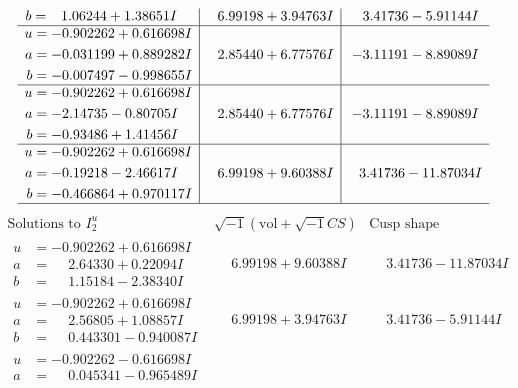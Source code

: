 \documentclass[1p]{elsarticle_modified}
\theoremstyle{definition}
\newcommand{\I}{\sqrt{-1}}
\begin{document}
$$\begin{array}{c|c|c}
\begin{aligned}
b &= \phantom{-}1.06244 + 1.38651 I\end{aligned}
 & \phantom{-}6.99198 + 3.94763 I & \phantom{-}3.41736 - 5.91144 I \\ \hline\begin{aligned}
u &= -0.902262 + 0.616698 I \\
a &= -0.031199 + 0.889282 I \\
b &= -0.007497 - 0.998655 I\end{aligned}
 & \phantom{-}2.85440 + 6.77576 I & -3.11191 - 8.89089 I \\ \hline\begin{aligned}
u &= -0.902262 + 0.616698 I \\
a &= -2.14735 - 0.80705 I \\
b &= -0.93486 + 1.41456 I\end{aligned}
 & \phantom{-}2.85440 + 6.77576 I & -3.11191 - 8.89089 I \\ \hline\begin{aligned}
u &= -0.902262 + 0.616698 I \\
a &= -0.19218 - 2.46617 I \\
b &= -0.466864 + 0.970117 I\end{aligned}
 & \phantom{-}6.99198 + 9.60388 I & \phantom{-}3.41736 - 11.87034 I\\
 \hline 
 \end{array}$$\newpage$$\begin{array}{c|c|c}  
\text{Solutions to }I^u_{2}& \I (\text{vol} + \sqrt{-1}CS) & \text{Cusp shape}\\
 \hline 
\begin{aligned}
u &= -0.902262 + 0.616698 I \\
a &= \phantom{-}2.64330 + 0.22094 I \\
b &= \phantom{-}1.15184 - 2.38340 I\end{aligned}
 & \phantom{-}6.99198 + 9.60388 I & \phantom{-}3.41736 - 11.87034 I \\ \hline\begin{aligned}
u &= -0.902262 + 0.616698 I \\
a &= \phantom{-}2.56805 + 1.08857 I \\
b &= \phantom{-}0.443301 - 0.940087 I\end{aligned}
 & \phantom{-}6.99198 + 3.94763 I & \phantom{-}3.41736 - 5.91144 I \\ \hline\begin{aligned}
u &= -0.902262 - 0.616698 I \\
a &= \phantom{-}0.045341 - 0.965489 I \\

\end{aligned}
\end{array}$$
\end{document}
